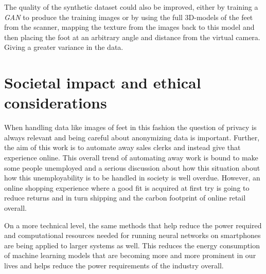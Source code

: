 \documentclass{kththesis}
\begin{document}
The quality of the synthetic dataset could also be improved, either by training a
\textit{GAN} to produce the training images or by using the full 3D-models of
the feet from the scanner, mapping the texture from the images back to this model
and then placing the foot at an arbitrary angle and distance from the virtual
camera. Giving a greater variance in the data.

\section{Societal impact and ethical considerations}
When handling data like images of feet in this fashion the question of privacy
is always relevant and being careful about anonymizing data is important.
Further, the aim of this work is to automate away sales clerks and instead
give that experience online. This overall trend of automating away work is
bound to make some people unemployed and a serious discussion about how this
situation about how this unemployability is to be handled in society is well
overdue. However, an online shopping experience where a good fit is acquired at
first try is going to reduce returns and in turn shipping and the carbon
footprint of online retail overall. 

On a more technical level, the same methods that help reduce the power required
and computational resources needed for running neural networks on smartphones
are being applied to larger systems as well. This reduces the energy consumption
of machine learning models that are becoming more and more prominent in our
lives and helps reduce the power requirements of the industry overall.

\printbibliography[heading=bibintoc]%


\end{document}

